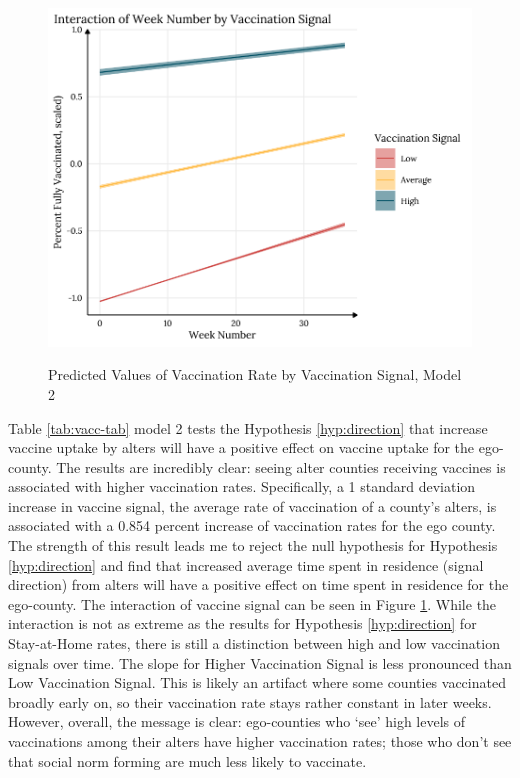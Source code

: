 \begin{figure}
{\centering \includegraphics[width=0.8\linewidth]{figs/paper3/plot-vacc-h2-1}}
\caption{Predicted Values of Vaccination Rate by Vaccination Signal, Model 2}\label{fig:plot-vacc-h2}
\end{figure}

Table \ref{tab:vacc-tab} model 2 tests the Hypothesis \ref{hyp:direction} that
increase vaccine uptake by alters will have a positive effect on vaccine uptake
for the ego-county. The results are incredibly clear: seeing alter counties
receiving vaccines is associated with higher vaccination rates. Specifically, a
1 standard deviation increase in vaccine signal, the average rate of vaccination
of a county's alters, is associated with a 0.854 percent increase of vaccination
rates for the ego county. The strength of this result leads me to reject the
null hypothesis for Hypothesis \ref{hyp:direction} and find that increased
average time spent in residence (signal direction) from alters will have a
positive effect on time spent in residence for the ego-county. The interaction
of vaccine signal can be seen in Figure \ref{fig:plot-vacc-h2}. While the
interaction is not as extreme as the results for Hypothesis \ref{hyp:direction}
for Stay-at-Home rates, there is still a distinction between high and low
vaccination signals over time. The slope for Higher Vaccination Signal is less
pronounced than Low Vaccination Signal. This is likely an artifact where some
counties vaccinated broadly early on, so their vaccination rate stays rather
constant in later weeks. However, overall, the message is clear: ego-counties
who `see' high levels of vaccinations among their alters have higher vaccination
rates; those who don't see that social norm forming are much less likely to
vaccinate.

